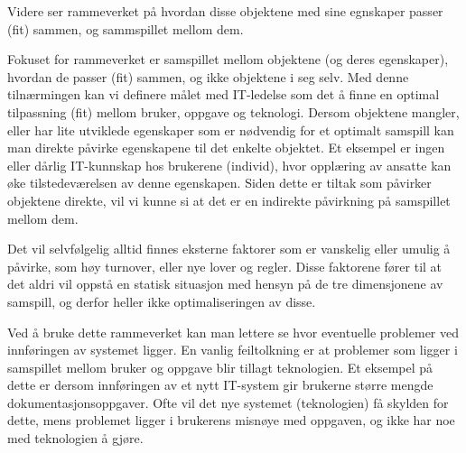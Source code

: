 \noindent
Videre ser rammeverket på hvordan disse objektene med sine egnskaper passer (fit) sammen, og sammspillet mellom dem.

Fokuset for rammeverket er samspillet mellom objektene (og deres egenskaper), hvordan de passer (fit) sammen, og ikke objektene i seg selv. Med denne tilnærmingen kan vi definere målet med IT-ledelse som det å finne en optimal tilpassning (fit) mellom bruker, oppgave og teknologi. Dersom objektene mangler, eller har lite utviklede egenskaper som er nødvendig for et optimalt samspill kan man direkte påvirke egenskapene til det enkelte objektet. Et eksempel er ingen eller dårlig IT-kunnskap hos brukerene (individ), hvor opplæring av ansatte kan øke tilstedeværelsen av denne egenskapen. Siden dette er tiltak som påvirker objektene direkte, vil vi kunne si at det er en indirekte påvirkning på samspillet mellom dem.

\noindent
Det vil selvfølgelig alltid finnes eksterne faktorer som er vanskelig eller umulig å påvirke, som høy turnover, eller nye lover og regler. Disse faktorene fører til at det aldri vil oppstå en statisk situasjon med hensyn på de tre dimensjonene av samspill, og derfor heller ikke optimaliseringen av disse.

\noindent
Ved å bruke dette rammeverket kan man lettere se hvor eventuelle problemer ved innføringen av systemet ligger. En vanlig feiltolkning er at problemer som ligger i samspillet mellom bruker og oppgave blir tillagt teknologien. Et eksempel på dette er dersom innføringen av et nytt IT-system gir brukerne større mengde dokumentasjonsoppgaver. Ofte vil det nye systemet (teknologien) få skylden for dette, mens problemet ligger i brukerens misnøye med oppgaven, og ikke har noe med teknologien å gjøre.

